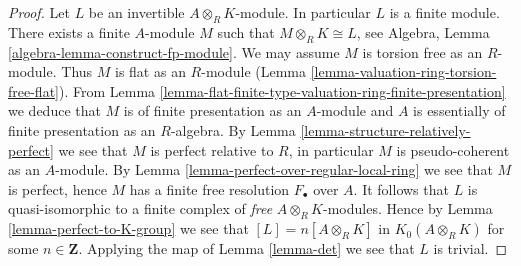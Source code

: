 \begin{proof}
Let $L$ be an invertible $A \otimes_R K$-module. In particular $L$ is
a finite module. There exists a finite $A$-module
$M$ such that $M \otimes_R K \cong L$, see
Algebra, Lemma \ref{algebra-lemma-construct-fp-module}.
We may assume $M$ is torsion free as an $R$-module.
Thus $M$ is flat as an $R$-module
(Lemma \ref{lemma-valuation-ring-torsion-free-flat}).
From Lemma \ref{lemma-flat-finite-type-valuation-ring-finite-presentation}
we deduce that $M$ is of finite presentation as an $A$-module
and $A$ is essentially of finite presentation as an $R$-algebra.
By Lemma \ref{lemma-structure-relatively-perfect}
we see that $M$ is perfect relative to $R$,
in particular $M$ is pseudo-coherent as an $A$-module.
By Lemma \ref{lemma-perfect-over-regular-local-ring}
we see that $M$ is perfect, hence
$M$ has a finite free resolution $F_\bullet$ over $A$.
It follows that $L$ is quasi-isomorphic to a finite complex
of {\it free} $A \otimes_R K$-modules. Hence by
Lemma \ref{lemma-perfect-to-K-group} we see that
$[L] = n[A \otimes_R K]$ in $K_0(A \otimes_R K)$
for some $n \in \mathbf{Z}$.
Applying the map of Lemma \ref{lemma-det}
we see that $L$ is trivial.
\end{proof}






